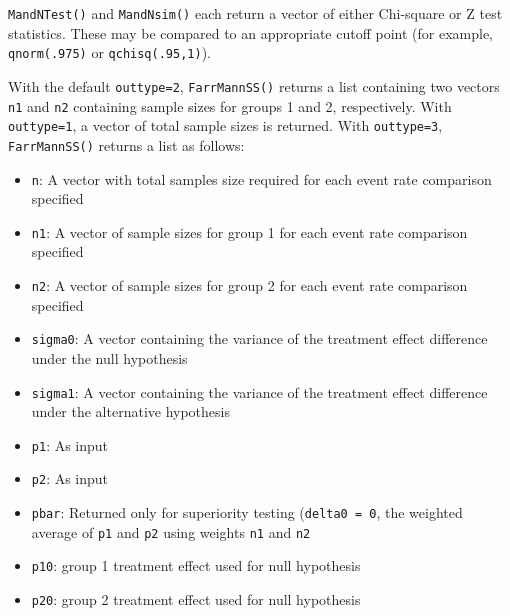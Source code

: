 \texttt{MandNTest()} and \texttt{MandNsim()} each return a vector of either
Chi-square or Z test statistics. These may be compared to an appropriate
cutoff point (for example, \texttt{qnorm(.975)} or \texttt{qchisq(.95,1)}).

With the default \texttt{outtype=2}, \texttt{FarrMannSS()} returns a list
containing two vectors \texttt{n1} and \texttt{n2} containing sample sizes for
groups 1 and 2, respectively. With \texttt{outtype=1}, a vector of total
sample sizes is returned. With \texttt{outtype=3}, \texttt{FarrMannSS()}
returns a list as follows:

\bigskip

\begin{itemize}
\item \texttt{n}: A vector with total samples size required for each event
rate comparison specified

\item \texttt{n1}: A vector of sample sizes for group 1 for each event rate
comparison specified

\item \texttt{n2}: A vector of sample sizes for group 2 for each event rate
comparison specified

\item \texttt{sigma0}: A vector containing the variance of the treatment
effect difference under the null hypothesis

\item \texttt{sigma1}: A vector containing the variance of the treatment
effect difference under the alternative hypothesis

\item \texttt{p1}: As input

\item \texttt{p2}: As input

\item \texttt{pbar}: Returned only for superiority testing 
(\texttt{delta0 = 0}, the weighted average of \texttt{p1} and 
\texttt{p2} using weights \texttt{n1} and \texttt{n2}

\item \texttt{p10}: group 1 treatment effect used for null hypothesis

\item \texttt{p20}: group 2 treatment effect used for null hypothesis
\end{itemize}


